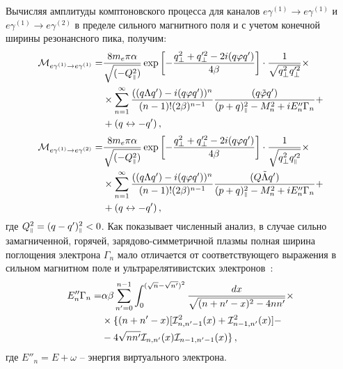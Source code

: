 Вычисляя амплитуды комптоновского процесса для каналов $e\gamma^{(1)}\to 
e\gamma^{(1)}$ и $e\gamma^{(1)}\to e\gamma^{(2)}$ в пределе сильного 
магнитного поля и с учетом конечной ширины резонансного пика, получим:
\begin{equation}\label{Mres}
	\begin{aligned}
		{\cal M}_{e\gamma^{(1)}\to e\gamma^{(1)}}=& 
		\frac{8m_e\pi\alpha}{\sqrt{(-Q^2_{\mbox{\tiny $\|$}})}} 
		\exp\left[-\frac{q^2_\perp+q'^2_\perp-2i(q\varphi 
		q')}{4\beta}\right]\cdot\frac{1}{\sqrt{q^2_\perp q'^2_\perp}}\times 
		\\ &\times \sum_{n=1}^{\infty}\frac{((q\Lambda
			q')-i(q\varphi
			q'))^{n}}{(n-1)!(2\beta)^{n-1}}
		\frac{(q\tilde{\varphi}q')}{(p+q)^2_{\mbox{\tiny $\|$}}-M_n^2+iE''_n\Gamma_n }+\\
		&+(q\leftrightarrow-q')\, ,
	\end{aligned}
\end{equation}
\begin{equation}\label{Mres12}
	\begin{aligned}
		{\cal M}_{e\gamma^{(1)}\to e\gamma^{(2)}}=& 
		\frac{8m_e\pi\alpha}{\sqrt{(-Q^2_{\mbox{\tiny $\|$}})}} 
		\exp\left[-\frac{q^2_\perp+q'^2_\perp-2i(q\varphi 
		q')}{4\beta}\right]\cdot\frac{1}{\sqrt{q^2_\perp q'^2_{\mbox{\tiny $\|$}}}}\times 
		\\ &\times \sum_{n=1}^{\infty}\frac{((q\Lambda
			q')-i(q\varphi
			q'))^{n}}{(n-1)!(2\beta)^{n-1}}
		\frac{(Q\tilde{\Lambda}q')}{(p+q)^2_{\mbox{\tiny $\|$}}-M_n^2+iE''_n\Gamma_n }+\\
		&+(q\leftrightarrow-q')\, ,
	\end{aligned}
\end{equation}
где   
$Q^2_{\mbox{\tiny $\|$}} = (q - q')^2_{\mbox{\tiny $\|$}} <0$. Как показывает численный анализ, в 
случае сильно замагниченной, горячей, зарядово-симметричной плазмы полная 
ширина поглощения электрона $\Gamma_n$ мало отличается от соответствующего 
выражения в 
сильном магнитном поле и ультрарелятивистских электронов~\cite{KM_Book_2013}:
\begin{equation}\label{Shir}
	\begin{aligned}
		E''_n\Gamma_n=&\alpha \beta \sum_{n'=0}^{n-1}\int_{0}^{(\sqrt{n}-\sqrt{n'})^2}\frac{dx}{\sqrt{(n+n'-x)^2-4n n'}}\times\\
		&\times\{(n+n'-x)[{\cal I}^2_{n,n'-1}(x)+{\cal I}^2_{n-1,n'}(x)]-\\
		&-4\sqrt{nn'}{\cal I}_{n,n'}(x){\cal I}_{n-1,n'-1}(x)\}\, ,
	\end{aligned}
\end{equation}
где $E''_n=E+\omega$ -- энергия виртуального электрона.

